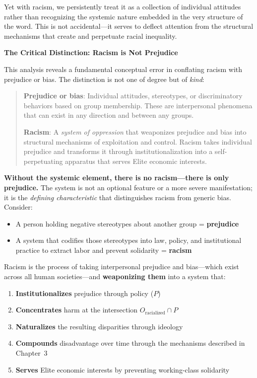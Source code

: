 \documentclass[12pt,openany]{book}
\begin{document}
Yet with racism, we persistently treat it as a collection of individual attitudes rather than recognizing the systemic nature embedded in the very structure of the word. This is not accidental---it serves to deflect attention from the structural mechanisms that create and perpetuate racial inequality.

\textbf{The Critical Distinction: Racism is Not Prejudice}

This analysis reveals a fundamental conceptual error in conflating racism with prejudice or bias. The distinction is not one of degree but of \textit{kind}:

\begin{quote}
\textbf{Prejudice or bias}: Individual attitudes, stereotypes, or discriminatory behaviors based on group membership. These are interpersonal phenomena that can exist in any direction and between any groups.

\textbf{Racism}: A \textit{system of oppression} that weaponizes prejudice and bias into structural mechanisms of exploitation and control. Racism takes individual prejudice and transforms it through institutionalization into a self-perpetuating apparatus that serves Elite economic interests.
\end{quote}

\textbf{Without the systemic element, there is no racism---there is only prejudice.} The system is not an optional feature or a more severe manifestation; it is the \textit{defining characteristic} that distinguishes racism from generic bias. Consider:

\begin{itemize}
    \item A person holding negative stereotypes about another group = \textbf{prejudice}
    \item A system that codifies those stereotypes into law, policy, and institutional practice to extract labor and prevent solidarity = \textbf{racism}
\end{itemize}

Racism is the process of taking interpersonal prejudice and bias---which exist across all human societies---and \textbf{weaponizing them} into a system that:
\begin{enumerate}
    \item \textbf{Institutionalizes} prejudice through policy ($P$)
    \item \textbf{Concentrates} harm at the intersection $O_{\text{racialized}} \cap P$
    \item \textbf{Naturalizes} the resulting disparities through ideology
    \item \textbf{Compounds} disadvantage over time through the mechanisms described in Chapter~3
    \item \textbf{Serves} Elite economic interests by preventing working-class solidarity
\end{enumerate}
\end{document}
